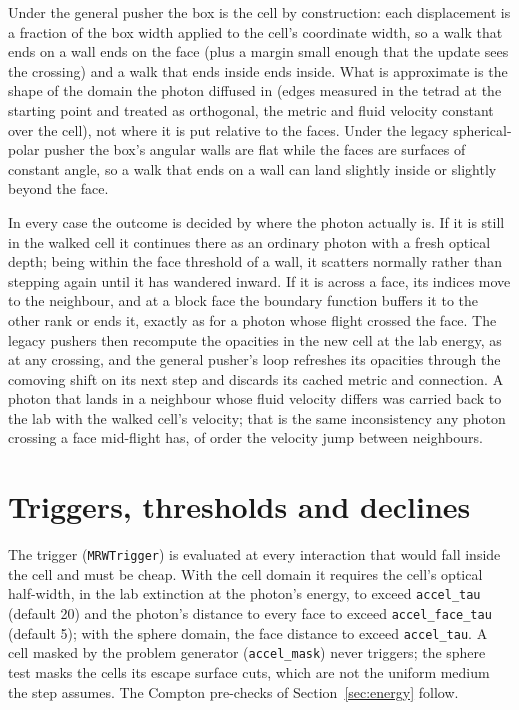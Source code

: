 \documentclass[11pt]{article}
\newcommand{\key}[1]{\texttt{#1}}
\begin{document}
Under the general pusher the box is the cell by construction: each displacement is a
fraction of the box width applied to the cell's coordinate width, so a walk that ends on
a wall ends on the face (plus a margin small enough that the update sees the crossing)
and a walk that ends inside ends inside.  What is approximate is the shape of the domain
the photon diffused in (edges measured in the tetrad at the starting point and treated
as orthogonal, the metric and fluid velocity constant over the cell), not where it is
put relative to the faces.  Under the legacy spherical-polar pusher the box's angular
walls are flat while the faces are surfaces of constant angle, so a walk that ends on a
wall can land slightly inside or slightly beyond the face.

In every case the outcome is decided by where the photon actually is.  If it is still in
the walked cell it continues there as an ordinary photon with a fresh optical depth;
being within the face threshold of a wall, it scatters normally rather than stepping
again until it has wandered inward.  If it is across a face, its indices move to the
neighbour, and at a block face the boundary function buffers it to the other rank or
ends it, exactly as for a photon whose flight crossed the face.  The legacy pushers then
recompute the opacities in the new cell at the lab energy, as at any crossing, and the
general pusher's loop refreshes its opacities through the comoving shift on its next
step and discards its cached metric and connection.  A photon that lands in a
neighbour whose fluid velocity differs was carried back to the lab with the walked
cell's velocity; that is the same inconsistency any photon crossing a face mid-flight
has, of order the velocity jump between neighbours.

\section{Triggers, thresholds and declines}
\label{sec:thresholds}

The trigger (\texttt{MRWTrigger}) is evaluated at every interaction that would fall
inside the cell and must be cheap.  With the cell domain it requires the cell's optical
half-width, in the lab extinction at the photon's energy, to exceed \key{accel\_tau}
(default 20) and the photon's distance to every face to exceed \key{accel\_face\_tau}
(default 5); with the sphere domain, the face distance to exceed \key{accel\_tau}.  A
cell masked by the problem generator (\texttt{accel\_mask}) never triggers; the sphere
test masks the cells its escape surface cuts, which are not the uniform medium the step
assumes.  The Compton pre-checks of Section~\ref{sec:energy} follow.
\end{document}
